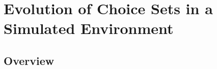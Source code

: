



\section{Evolution of Choice Sets in a Simulated
Environment}
\label{sec:Evolution-of-choice}

\subsection{Overview}

